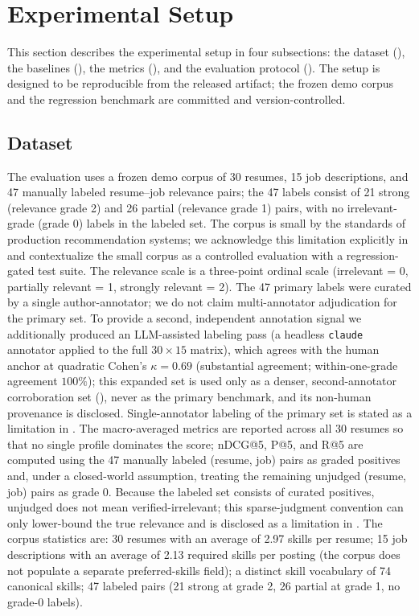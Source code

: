\section{Experimental Setup}\label{sec:4}

This section describes the experimental setup in four subsections: the dataset (), the baselines (), the metrics (), and the evaluation protocol ().
The setup is designed to be reproducible from the released artifact; the frozen demo corpus and the regression benchmark are committed and version-controlled.

\subsection{Dataset}\label{sec:4.1}
The evaluation uses a frozen demo corpus of 30 resumes, 15 job descriptions, and 47 manually labeled resume--job relevance pairs; the 47 labels consist of 21 strong (relevance grade 2) and 26 partial (relevance grade 1) pairs, with no irrelevant-grade (grade 0) labels in the labeled set.
The corpus is small by the standards of production recommendation systems; we acknowledge this limitation explicitly in  and contextualize the small corpus as a controlled evaluation with a regression-gated test suite.
The relevance scale is a three-point ordinal scale (irrelevant = 0, partially relevant = 1, strongly relevant = 2). The 47 primary labels were curated by a single author-annotator; we do not claim multi-annotator adjudication for the primary set. To provide a second, independent annotation signal we additionally produced an LLM-assisted labeling pass (a headless \texttt{claude} annotator applied to the full $30 \times 15$ matrix), which agrees with the human anchor at quadratic Cohen's $\kappa = 0.69$ (substantial agreement; within-one-grade agreement $100\%$); this expanded set is used only as a denser, second-annotator corroboration set (), never as the primary benchmark, and its non-human provenance is disclosed. Single-annotator labeling of the primary set is stated as a limitation in .
The macro-averaged metrics are reported across all 30 resumes so that no single profile dominates the score; nDCG@5, P@5, and R@5 are computed using the 47 manually labeled (resume, job) pairs as graded positives and, under a closed-world assumption, treating the remaining unjudged (resume, job) pairs as grade 0. Because the labeled set consists of curated positives, unjudged does not mean verified-irrelevant; this sparse-judgment convention can only lower-bound the true relevance and is disclosed as a limitation in .
The corpus statistics are: 30 resumes with an average of 2.97 skills per resume; 15 job descriptions with an average of 2.13 required skills per posting (the corpus does not populate a separate preferred-skills field); a distinct skill vocabulary of 74 canonical skills; 47 labeled pairs (21 strong at grade 2, 26 partial at grade 1, no grade-0 labels).

